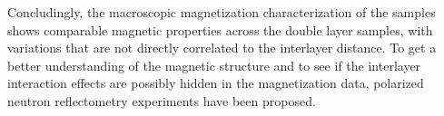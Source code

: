 \documentclass[\main/dresen_thesis.tex]{subfiles}
\begin{document}
  Concludingly, the macroscopic magnetization characterization of the samples shows comparable magnetic properties across the double layer samples, with variations that are not directly correlated to the interlayer distance.
  To get a better understanding of the magnetic structure and to see if the interlayer interaction effects are possibly hidden in the magnetization data, polarized neutron reflectometry experiments have been proposed.


\end{document}
